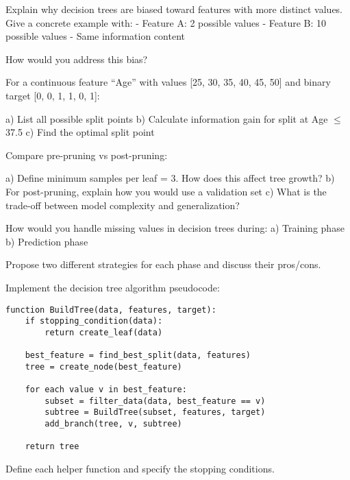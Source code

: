 \documentclass{article}
\newcounter{exercise}
\begin{document}
\begin{tcolorbox}[colback=gray!5!white,colframe=gray!75!black,title=Problem \stepcounter{exercise}: Feature Selection Bias]

Explain why decision trees are biased toward features with more distinct values. Give a concrete example with:
- Feature A: 2 possible values
- Feature B: 10 possible values
- Same information content

How would you address this bias?
\end{tcolorbox}

\begin{tcolorbox}[colback=gray!5!white,colframe=gray!75!black,title=Problem \stepcounter{exercise}: Continuous Feature Splits]

For a continuous feature ``Age'' with values [25, 30, 35, 40, 45, 50] and binary target [0, 0, 1, 1, 0, 1]:

a) List all possible split points
b) Calculate information gain for split at Age $\leq$ 37.5
c) Find the optimal split point
\end{tcolorbox}

\begin{tcolorbox}[colback=gray!5!white,colframe=gray!75!black,title=Problem \stepcounter{exercise}: Pruning Strategies]

Compare pre-pruning vs post-pruning:

a) Define minimum samples per leaf = 3. How does this affect tree growth?
b) For post-pruning, explain how you would use a validation set
c) What is the trade-off between model complexity and generalization?
\end{tcolorbox}

\begin{tcolorbox}[colback=gray!5!white,colframe=gray!75!black,title=Problem \stepcounter{exercise}: Missing Values]

How would you handle missing values in decision trees during:
a) Training phase
b) Prediction phase

Propose two different strategies for each phase and discuss their pros/cons.
\end{tcolorbox}

\begin{tcolorbox}[colback=gray!5!white,colframe=gray!75!black,title=Problem \stepcounter{exercise}: Implementation Challenge]

Implement the decision tree algorithm pseudocode:

\begin{verbatim}
function BuildTree(data, features, target):
    if stopping_condition(data):
        return create_leaf(data)
    
    best_feature = find_best_split(data, features)
    tree = create_node(best_feature)
    
    for each value v in best_feature:
        subset = filter_data(data, best_feature == v)
        subtree = BuildTree(subset, features, target)
        add_branch(tree, v, subtree)
    
    return tree
\end{verbatim}

Define each helper function and specify the stopping conditions.
\end{tcolorbox}
\end{document}
